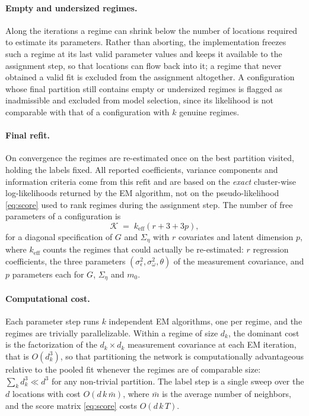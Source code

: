 \paragraph{Empty and undersized regimes.} Along the iterations a regime can shrink below the number of locations required to estimate its parameters. Rather than aborting, the implementation freezes such a regime at its last valid parameter values and keeps it available to the assignment step, so that locations can flow back into it; a regime that never obtained a valid fit is excluded from the assignment altogether. A configuration whose final partition still contains empty or undersized regimes is flagged as inadmissible and excluded from model selection, since its likelihood is not comparable with that of a configuration with $k$ genuine regimes.

\paragraph{Final refit.} On convergence the regimes are re-estimated once on the best partition visited, holding the labels fixed. All reported coefficients, variance components and information criteria come from this refit and are based on the \emph{exact} cluster-wise log-likelihoods returned by the EM algorithm, not on the pseudo-likelihood \eqref{eq:score} used to rank regimes during the assignment step. The number of free parameters of a configuration is
\begin{equation}\label{eq:npar}
  \mathcal{K} \;=\; k_{\mathrm{eff}} \left(r + 3 + 3p\right),
\end{equation}
for a diagonal specification of $G$ and $\Sigma_\eta$ with $r$ covariates and latent dimension $p$, where $k_{\mathrm{eff}}$ counts the regimes that could actually be re-estimated: $r$ regression coefficients, the three parameters $(\sigma^2_\epsilon, \sigma^2_\omega, \theta)$ of the measurement covariance, and $p$ parameters each for $G$, $\Sigma_\eta$ and $m_0$.

\paragraph{Computational cost.} Each parameter step runs $k$ independent EM algorithms, one per regime, and the regimes are trivially parallelizable. Within a regime of size $d_k$, the dominant cost is the factorization of the $d_k \times d_k$ measurement covariance at each EM iteration, that is $O(d_k^3)$, so that partitioning the network is computationally advantageous relative to the pooled fit whenever the regimes are of comparable size: $\sum_k d_k^3 \ll d^3$ for any non-trivial partition. The label step is a single sweep over the $d$ locations with cost $O(d\, k\, \bar{m})$, where $\bar{m}$ is the average number of neighbors, and the score matrix \eqref{eq:score} costs $O(d\, k\, T)$.

